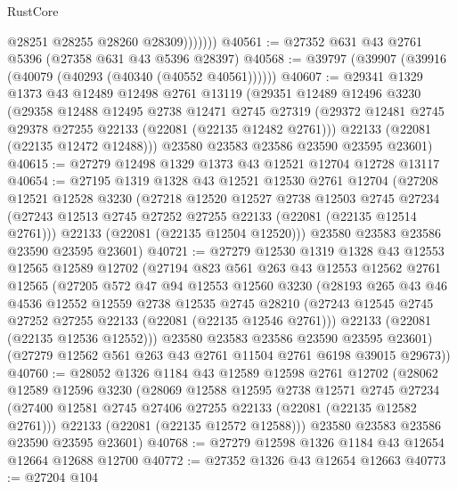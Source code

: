 \begin{lexlean}{RustCore}
\begin{coremodule}
                  @28251
                  @28255
                  @28260
                  @28309)))))))
@40561 := @27352 @631 @43 @2761 @5396 (@27358 @631 @43 @5396 @28397)
@40568 := @39797 (@39907 (@39916 (@40079 (@40293 (@40340 (@40552 @40561))))))
@40607 := @29341
    @1329
    @1373
    @43
    @12489
    @12498
    @2761
    @13119
    (@29351
      @12489
      @12496
      @3230
      (@29358
        @12488
        @12495
        @2738
        @12471
        @2745
        @27319
        (@29372 @12481 @2745 @29378 @27255 @22133 (@22081 (@22135 @12482 @2761)))
        @22133
        (@22081 (@22135 @12472 @12488)))
      @23580
      @23583
      @23586
      @23590
      @23595
      @23601)
@40615 := @27279 @12498 @1329 @1373 @43 @12521 @12704 @12728 @13117
@40654 := @27195
    @1319
    @1328
    @43
    @12521
    @12530
    @2761
    @12704
    (@27208
      @12521
      @12528
      @3230
      (@27218
        @12520
        @12527
        @2738
        @12503
        @2745
        @27234
        (@27243 @12513 @2745 @27252 @27255 @22133 (@22081 (@22135 @12514 @2761)))
        @22133
        (@22081 (@22135 @12504 @12520)))
      @23580
      @23583
      @23586
      @23590
      @23595
      @23601)
@40721 := @27279
    @12530
    @1319
    @1328
    @43
    @12553
    @12565
    @12589
    @12702
    (@27194
      @823
      @561
      @263
      @43
      @12553
      @12562
      @2761
      @12565
      (@27205
        @572
        @47
        @94
        @12553
        @12560
        @3230
        (@28193
          @265
          @43
          @46
          @4536
          @12552
          @12559
          @2738
          @12535
          @2745
          @28210
          (@27243 @12545 @2745 @27252 @27255 @22133 (@22081 (@22135 @12546 @2761)))
          @22133
          (@22081 (@22135 @12536 @12552)))
        @23580
        @23583
        @23586
        @23590
        @23595
        @23601)
      (@27279 @12562 @561 @263 @43 @2761 @11504 @2761 @6198 @39015 @29673))
@40760 := @28052
    @1326
    @1184
    @43
    @12589
    @12598
    @2761
    @12702
    (@28062
      @12589
      @12596
      @3230
      (@28069
        @12588
        @12595
        @2738
        @12571
        @2745
        @27234
        (@27400 @12581 @2745 @27406 @27255 @22133 (@22081 (@22135 @12582 @2761)))
        @22133
        (@22081 (@22135 @12572 @12588)))
      @23580
      @23583
      @23586
      @23590
      @23595
      @23601)
@40768 := @27279 @12598 @1326 @1184 @43 @12654 @12664 @12688 @12700
@40772 := @27352 @1326 @43 @12654 @12663
@40773 := @27204 @104

\end{coremodule}
\end{lexlean}
